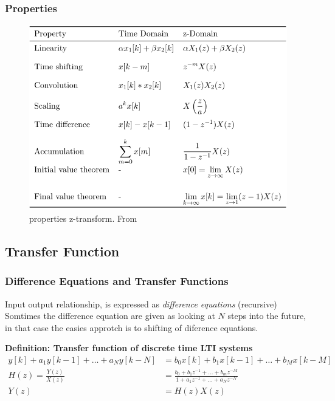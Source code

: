 \subsubsection{Properties}
\begin{figure}[!ht]
    \centering
    \includegraphics[width=12cm]{image/properties_z-transform.png}
    \caption{properties z-transform. From \cite{}}
    \label{fig:properties_z-transform}
\end{figure}


\subsection{Transfer Function}
\subsubsection{Difference Equations and Transfer Functions}
Input output relationship, is expressed as \textit{difference equations} (recursive)
Somtimes the difference equation are given as looking at $N$ steps into 
the future, in that case the easies approtch is to shifting of diference equations.

\textbf{Definition: Transfer function of discrete time LTI systems}
\begin{align*}
    y[k]+a_1y[k-1]+\ldots+a_N y[k-N] &= b_0 x[k]+b_1 x[k-1]+\ldots+b_M x[k-M] \\ 
    H(z) = \frac{Y(z)}{X(z)} &= \frac{b_0+b_1z^{-1}+\ldots+b_mz^{-M}}{1+a_1z^{-1}+\ldots+a_Nz^{-N}} \\
    Y(z) &= H(z)X(z)
\end{align*}



